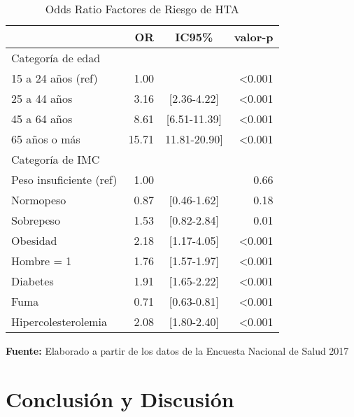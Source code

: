 \documentclass{aa}
\begin{document}
\begin{table}[]
\caption{\small Odds Ratio Factores de Riesgo de HTA}
    \centering
    \small
\begin{tabular}{lrcr}
\toprule
  & OR & IC95\% & valor-p\\
\midrule
Categoría de edad\\
\-\hspace{5mm} \tiny  15 a 24 años (ref) & 1.00 & & <0.001\\
\-\hspace{5mm} \tiny  25 a 44 años & 3.16 & [2.36-4.22] & <0.001\\
\-\hspace{5mm} \tiny  45 a 64 años & 8.61 & [6.51-11.39] & <0.001\\
\-\hspace{5mm} \tiny  65 años o más & 15.71 & 11.81-20.90] & <0.001\\
\addlinespace
Categoría de IMC\\
\-\hspace{5mm} \tiny  Peso insuficiente (ref) & 1.00 &  & 0.66\\
\-\hspace{5mm} \tiny  Normopeso & 0.87 & [0.46-1.62] & 0.18\\
\-\hspace{5mm} \tiny  Sobrepeso & 1.53 & [0.82-2.84] & 0.01\\
\-\hspace{5mm} \tiny  Obesidad & 2.18 & [1.17-4.05] & <0.001\\
\addlinespace
Hombre = 1 & 1.76 & [1.57-1.97] & <0.001\\
Diabetes & 1.91 & [1.65-2.22] & <0.001\\
\addlinespace
Fuma & 0.71 & [0.63-0.81] & <0.001\\
\addlinespace
Hipercolesterolemia & 2.08 & [1.80-2.40] & <0.001\\
\bottomrule
\end{tabular}
    \vspace{1ex}
    
    {\raggedright \small \textbf{Fuente:} Elaborado a partir de los datos de la Encuesta Nacional de Salud 2017 \par}
\end{table}


\section{Conclusión y Discusión}
\end{document}

